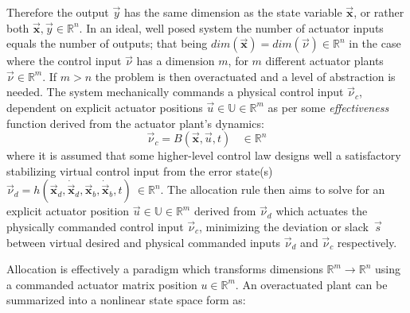 Therefore the output $\vec{y}$ has the same dimension as the state variable $\vec{\mathbf{x}}$, or rather both $\vec{\mathbf{x}},\vec{y} \in \mathbb{R}^n$. In an ideal, well posed system the number of actuator inputs equals the number of outputs; that being $dim(\vec{\mathbf{x}})=dim(\vec{\nu})\in \mathbb{R}^n$ in the case where the control input $\vec{\nu}$ has a dimension $m$, for $m$ different actuator plants $\vec{\nu} \in \mathbb{R}^m$. If $m>n$ the problem is then overactuated and a level of abstraction is needed. The system mechanically commands a physical control input $\vec{\nu}_c$, dependent on explicit actuator positions $\vec{u}\in\mathbb{U}\in\mathbb{R}^m$ as per some \emph{effectiveness} function derived from the actuator plant's dynamics:
\begin{equation}
\vec{\nu}_c=B(\vec{\mathbf{x}},\vec{u},t)~~~~\in\mathbb{R}^n
\end{equation}
where it is assumed that some higher-level control law designs well a satisfactory stabilizing virtual control input from the error state(s) $\vec{\nu}_d=h(\vec{\mathbf{x}}_d,\dot{\vec{\mathbf{x}}}_d,\vec{\mathbf{x}}_b,\dot{\vec{\mathbf{x}}}_b,t)~\in\mathbb{R}^n$. The allocation rule then aims to solve for an explicit actuator position $\vec{u}\in\mathbb{U}\in\mathbb{R}^m$ derived from $\vec{\nu}_d$ which actuates the physically commanded control input $\vec{\nu}_c$, minimizing the deviation or slack~$\vec{s}$ between virtual desired and physical commanded inputs $\vec{\nu}_d$ and $\vec{\nu}_c$ respectively. 
\par
Allocation is effectively a paradigm which transforms dimensions $\mathbb{R}^m\rightarrow\mathbb{R}^n$ using a commanded actuator matrix position $u\in\mathbb{R}^m$. An overactuated plant can be summarized into a nonlinear state space form as:
